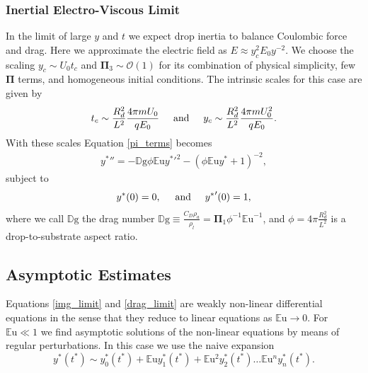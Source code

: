 \documentclass[aip,reprint, floatfix]{revtex4-1}
\begin{document}
\subsubsection{Inertial Electro-Viscous Limit}
In the limit of large $y$ and $t$ we expect drop inertia to balance Coulombic force and drag. Here we approximate the electric field as $E \approx y_c^2 E_0 y^{-2}$. We choose the scaling $y_c \sim U_0 t_c$ and $\mathbf{\Pi}_3 \sim \mathcal{O}(1)$ for its combination of physical simplicity, few $\mathbf{\Pi}$ terms, and homogeneous initial conditions. The intrinsic scales for this case are given by
\[ t_c \sim \frac{R_d^2}{L^2} \frac{4 \pi m U_0}{q E_0} \hspace{5mm} \mbox{and} \hspace{5 mm} y_c \sim \frac{R_d^2}{L^2} \frac{4 \pi m U_0^2}{q E_0}.
\]
With these scales Equation \ref{pi_terms} becomes 
\begin{eqnarray}
&{y^*}'' = - \mathbb{D}\mbox{g} \phi \mathbb{E}\mbox{u} {y^*}'^2 - \left( \phi \mathbb{E}\mbox{u} {y^*} + 1 \right)^{-2}, & \label{drag_limit}
\end{eqnarray}
subject to 
\begin{equation*}
{y^*}(0) = 0, \hspace{5 mm} \mbox{and} \hspace{5 mm} {y^*}'(0) = 1, 
\end{equation*}
where we call $\mathbb{D}\mbox{g}$ the drag number $\mathbb{D}\mbox{g} \equiv \frac{C_D \rho_a}{\rho_l} = \mathbf{\Pi}_1 \phi^{-1}{\mathbb{E}\mbox{u}}^{-1}$, and $\phi = 4 \pi \frac{R_d^2}{L^2}$ is a drop-to-substrate aspect ratio.

\subsection{Asymptotic Estimates}
Equations \ref{img_limit} and \ref{drag_limit} are weakly non-linear differential equations in the sense that they reduce to linear equations as $\mathbb{E}\mbox{u} \rightarrow 0$. For $\mathbb{E}\mbox{u} \ll 1$ we find asymptotic solutions of the non-linear equations by means of regular perturbations. In this case we use the naive expansion
\begin{equation}
{y^*}({t^*}) \sim y^*_0({t^*}) + \mathbb{E}\mbox{u} y^*_1({t^*}) + \mathbb{E}\mbox{u}^2 y^*_2({t^*}) \ldots \mathbb{E}\mbox{u}^n y^*_n ({t^*})  . \label{regular_pert}
\end{equation}
\end{document}
